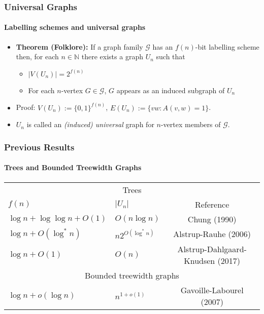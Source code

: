 \documentclass[aspectratio=169,xcolor=dvipsnames]{beamer}
\newcommand{\N}{\mathbb{N}}
\begin{document}
\begin{frame}
    \frametitle{Universal Graphs}
    \framesubtitle{Labelling schemes and universal graphs}

    \begin{itemize}
        \item<+->\textbf{Theorem (Folklore):}  If a graph family $\mathcal{G}$ has an $f(n)$-bit labelling scheme then, for each $n\in\N$ there exists a graph $U_n$ such that
        \begin{itemize}
            \item<+-> $|V(U_n)|=2^{f(n)}$
            \item<+-> For each $n$-vertex $G\in\mathcal{G}$, $G$ appears as an induced subgraph of $U_n$
        \end{itemize}
        \item<+->Proof: $V(U_n):=\{0,1\}^{f(n)}$, $E(U_n):=\{vw:A(v,w)=1\}$.
        \item<+->$U_n$ is called an \emph{(induced) universal} graph for $n$-vertex members of $\mathcal{G}$.
    \end{itemize}

\end{frame}


\begin{frame}
    \frametitle{Previous Results}
    \framesubtitle{Trees and Bounded Treewidth Graphs}

    \begin{center}
        \begin{tabular}{llc}
            \multicolumn{3}{c}{Trees} \\
            $f(n)$ & $|U_n|$ & Reference  \\ \hline
            $\log n+\log\log n+O(1)$ & $O(n\log n)$ & Chung (1990)   \\
            $\log n + O(\log^* n)$ & $n2^{O(\log^* n)}$ & Alstrup-Rauhe (2006) \\
            $\log n + O(1)$ & $O(n)$ & Alstrup-Dahlgaard-Knudsen (2017) \\[2em]
            \multicolumn{3}{c}{Bounded treewidth graphs} \\
            $\log n + o(\log n)$ & $n^{1+o(1)}$ & Gavoille-Labourel (2007) \\[2em]
        \end{tabular}
    \end{center}
\end{frame}
\end{document}
